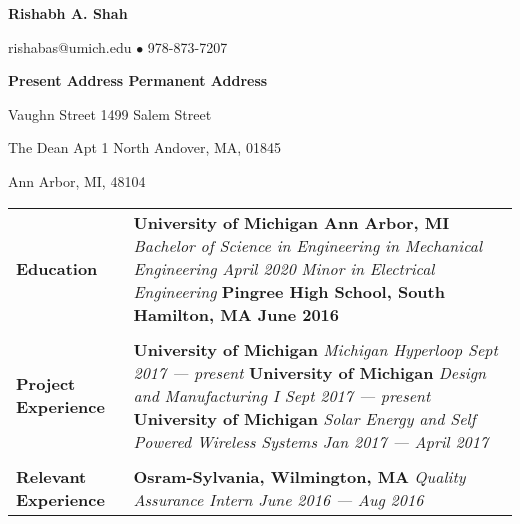 \documentclass[11pt]{article}
\begin{document}

\begin{center}
	{\large\textbf{Rishabh A. Shah}}

	rishabas@umich.edu $\bullet$ 978-873-7207 \\
\end{center}

\noindent\textbf{Present Address \hfill Permanent Address}

 Vaughn Street \hfill 1499 Salem Street

\noindent The Dean Apt 1 \hfill North Andover, MA, 01845

\noindent Ann Arbor, MI, 48104 \\


\begin{table}[H]
	\centering
	\begin{tabularx}{\textwidth}{@{}X p{5.25in} @{}}
		\textbf{Education} & \textbf{University of Michigan \hfill Ann Arbor, MI} \newline \textit{Bachelor of Science in Engineering in Mechanical Engineering \hfill April 2020} \newline \textit{Minor in Electrical Engineering} \newline \textbf{Pingree High School, South Hamilton, MA \hfill June 2016} \\

		 & \\

		\textbf{Project Experience} & \textbf{University of Michigan} \newline \textit{Michigan Hyperloop \hfill Sept 2017 --- present} \newline \textbf{University of Michigan} \newline \textit{Design and Manufacturing I \hfill Sept 2017 --- present } \newline \textbf{University of Michigan} \newline \textit{Solar Energy and Self Powered Wireless Systems \hfill Jan 2017 --- April 2017} \\
		 
		 & \\

		\textbf{Relevant Experience} & \textbf{Osram-Sylvania, Wilmington, MA} \newline \textit{Quality Assurance Intern \hfill June 2016 --- Aug 2016} \\


\end{tabularx}
\end{table}
\end{document}
